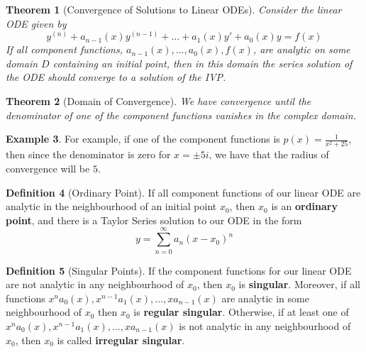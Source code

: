 \documentclass[12pt]{article}
\newtheorem{thm}{Theorem}[section]
\theoremstyle{definition}
\newtheorem{defn}[thm]{Definition}
\newtheorem{eg}[thm]{Example}
\theoremstyle{remark}
\numberwithin{equation}{section}
\newcommand\B[1]{\textbf{ #1}}
\begin{document}
\vspace{1cm}


\begin{thm}[Convergence of Solutions to Linear ODEs]
        Consider the linear ODE given by \begin{equation}
                y^{(n)}+a_{n-1}(x)y^{(n-1)}+...+a_1(x)y'+a_0(x)y=f(x)
        \end{equation}
        If all component functions, $a_{n-1}(x),...,a_0(x),f(x)$, are analytic on some domain $D$ containing an initial point, then in this domain the series solution of the ODE should converge to a solution of the IVP.
\end{thm}



\vspace{1cm}


\begin{thm}[Domain of Convergence]
        We have convergence until the denominator of one of the component functions vanishes in the complex domain.
\end{thm}
\begin{eg}
        For example, if one of the component functions is $p(x) = \frac{1}{x^2+25}$, then since the denominator is zero for $x = \pm 5i$, we have that the radius of convergence will be $5$.
\end{eg}



\vspace{1cm}


\begin{defn}[Ordinary Point]
        If all component functions of our linear ODE are analytic in the neighbourhood of an initial point $x_0$, then $x_0$ is an \B{ordinary point}, and there is a Taylor Series solution to our ODE in the form \begin{equation}
                y = \sum\limits_{n=0}^{\infty}a_n(x-x_0)^n
        \end{equation}
\end{defn}


\vspace{1cm}


\begin{defn}[Singular Points]
        If the component functions for our linear ODE are not analytic in any neighbourhood of $x_0$, then $x_0$ is \B{singular}. Moreover, if all functions $x^na_0(x), x^{n-1}a_1(x),...,xa_{n-1}(x)$ are analytic in some neighbourhood of $x_0$ then $x_0$ is \B{regular singular}. Otherwise, if at least one of $x^na_0(x), x^{n-1}a_1(x),...,xa_{n-1}(x)$ is not analytic in any neighbourhood of $x_0$, then $x_0$ is called \B{irregular singular}.
\end{defn}
\end{document}
